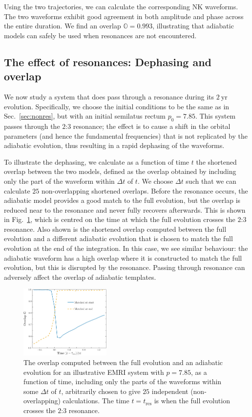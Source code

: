 \documentclass[aps,prd,amsfonts,amssymb,amsmath,nofootinbib,showpacs,superscriptaddress,twocolumn,floatfix]{revtex4-1}
\newcommand{\figref}[1]{Fig.~\ref{fig:#1}}
\newcommand{\secref}[1]{Sec.~\ref{sec:#1}}
\newcommand{\sub}[1]{\ensuremath{_\mathrm{#1}}}
\begin{document}
Using the two trajectories, we can calculate the corresponding NK waveforms. The two waveforms exhibit good agreement in both amplitude and phase across the entire duration. We find an overlap $\mathbb{O} = 0.993$, illustrating that adiabatic models can safely be used when resonances are not encountered.

\subsection{The effect of resonances: Dephasing and overlap}
\label{sec:effres-phase}

We now study a system that does pass through a resonance during its $2~\mathrm{yr}$ evolution. Specifically, we choose the initial conditions to be the same as in \secref{nonres}, but with an initial semilatus rectum $p_0 = 7.85$. This system passes through the $2$:$3$ resonance; the effect is to cause a shift in the orbital parameters (and hence the fundamental frequencies) that is not replicated by the adiabatic evolution, thus resulting in a rapid dephasing of the waveforms.

To illustrate the dephasing, we calculate as a function of time $t$ the shortened overlap between the two models, defined as the overlap obtained by including only the part of the waveform within $\Delta t$ of $t$. We choose $\Delta t$ such that we can calculate $25$ non-overlapping shortened overlaps. Before the resonance occurs, the adiabatic model provides a good match to the full evolution, but the overlap is reduced near to the resonance and never fully recovers afterwards. This is shown in \figref{overlap-dephasing}, which is centred on the time at which the full evolution crosses the $2$:$3$ resonance. Also shown is the shortened overlap computed between the full evolution and a different adiabatic evolution that is chosen to match the full evolution at the end of the integration. In this case, we see similar behaviour: the adiabatic waveform has a high overlap where it is constructed to match the full evolution, but this is disrupted by the resonance. Passing through resonance can adversely affect the overlap of adiabatic templates.

\begin{figure}
\centering
\includegraphics[width=0.4\textwidth]{Fig_overlap}
\caption{\label{fig:overlap-dephasing}The overlap computed between the full evolution and an adiabatic evolution for an illustrative EMRI system with $p=7.85$, as a function of time, including only the parts of the waveforms within some $\Delta t$ of $t$, arbitrarily chosen to give $25$ independent (non-overlapping) calculations. The time $t = t\sub{res}$ is when the full evolution crosses the $2$:$3$ resonance.}
\end{figure}
\end{document}
